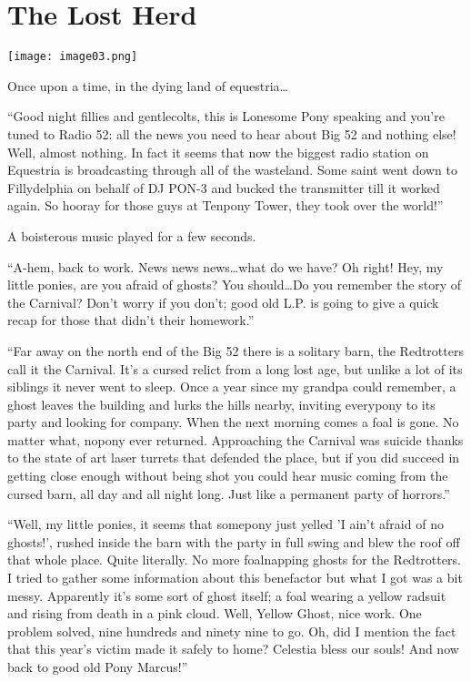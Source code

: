 \chapter{The Lost Herd}

\texttt{[image: image03.png]}

\begin{intro}
    Once upon a time, in the dying land of equestria\dots
\end{intro}

{\rt ``Good night fillies and gentlecolts, this is Lonesome Pony speaking and you're tuned to Radio 52: all the news you need to hear about Big 52 and nothing else! Well, almost nothing. In fact it seems that now the biggest radio station on Equestria is broadcasting through all of the wasteland. Some saint went down to Fillydelphia on behalf of DJ PON-3 and bucked the transmitter till it worked again. So hooray for those guys at Tenpony Tower, they took over the world!''}

A boisterous music played for a few seconds.

{\rt ``A-hem, back to work. News news news\dots what do we have? Oh right! Hey, my little ponies, are you afraid of ghosts? You should\dots Do you remember the story of the Carnival? Don't worry if you don't; good old L.P. is going to give a quick recap for those that didn't their homework.''}

{\rt ``Far away on the north end of the Big 52 there is a solitary barn, the Redtrotters call it the Carnival. It's a cursed relict from a long lost age, but unlike a lot of its siblings it never went to sleep. Once a year since my grandpa could remember, a ghost leaves the building and lurks the hills nearby, inviting everypony to its party and looking for company. When the next morning comes a foal is gone. No matter what, nopony ever returned. Approaching the Carnival was suicide thanks to the state of art laser turrets that defended the place, but if you did succeed in getting close enough without being shot you could hear music coming from the cursed barn, all day and all night long. Just like a permanent party of horrors.''}

{\rt ``Well, my little ponies, it seems that somepony just yelled 'I ain't afraid of no ghosts!', rushed inside the barn with the party in full swing and blew the roof off that whole place. Quite literally. No more foalnapping ghosts for the Redtrotters. I tried to gather some information about this benefactor but what I got was a bit messy. Apparently it's some sort of ghost itself; a foal wearing a yellow radsuit and rising from death in a pink cloud. Well, Yellow Ghost, nice work. One problem solved, nine hundreds and ninety nine to go. Oh, did I mention the fact that this year's victim made it safely to home? Celestia bless our souls! And now back to good old Pony Marcus!''}

